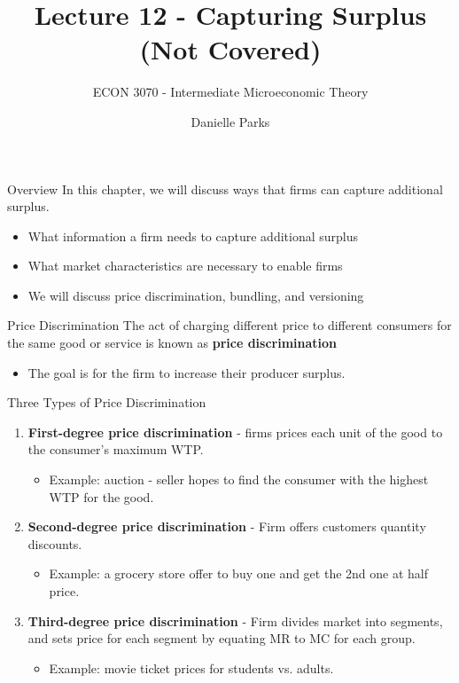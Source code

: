 \documentclass{beamer}
\author{Danielle Parks}
\title{Lecture 12 - Capturing Surplus (Not Covered)}
\subtitle{ECON 3070 - Intermediate Microeconomic Theory}
\begin{document}
\begin{frame}
  \titlepage
\end{frame}

\begin{frame}{Overview}
  In this chapter, we will discuss ways that firms can capture additional surplus.

  \begin{itemize}
    \item What information a firm needs to capture additional surplus
    \item What market characteristics are necessary to enable firms
    \item We will discuss price discrimination, bundling, and versioning
  \end{itemize}
\end{frame}

\begin{frame}{Price Discrimination}
  The act of charging different price to different consumers for the same good or service is known as \textbf{price discrimination}

  \begin{itemize}
    \item The goal is for the firm to increase their producer surplus.
  \end{itemize}
\end{frame}

\begin{frame}{Three Types of Price Discrimination}
  \begin{enumerate}
    \item \textbf{First-degree price discrimination} - firms prices each unit of the good to the consumer's maximum WTP.
    \begin{itemize}
      \item Example: auction - seller hopes to find the consumer with the highest WTP for the good.
    \end{itemize}
    
    \item \textbf{Second-degree price discrimination} - Firm offers customers quantity discounts.
    
    \begin{itemize}
      \item Example: a grocery store offer to buy one and get the 2nd one at half price.
    \end{itemize}
    
    \item \textbf{Third-degree price discrimination} - Firm divides market into segments, and sets price for each segment by equating MR to MC for each group.
    
    \begin{itemize}
      \item Example: movie ticket prices for students vs. adults.
    \end{itemize}
  \end{enumerate}
\end{frame}
\end{document}
